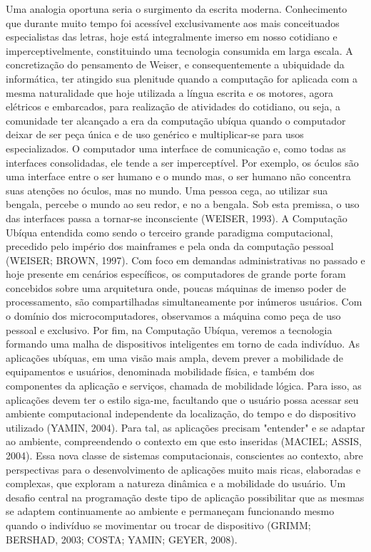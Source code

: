 \documentclass[12pt,a4paper,compsoc]{IEEEtran}
\begin{document}
Uma analogia oportuna seria o surgimento da escrita moderna. Conhecimento que durante muito tempo foi acessível exclusivamente aos mais conceituados especialistas das letras, hoje está integralmente imerso em nosso cotidiano e imperceptivelmente, constituindo uma tecnologia consumida em larga escala.
A concretização do pensamento de Weiser, e consequentemente a ubiquidade da informática, ter atingido sua plenitude quando a computação for aplicada com a mesma naturalidade que hoje  utilizada a língua escrita e os motores, agora elétricos e embarcados, para realização de atividades do cotidiano, ou seja, a comunidade ter alcançado a era da computação ubíqua quando o computador deixar de ser peça única e de uso genérico e multiplicar-se para usos especializados.
O computador uma interface de comunicação e, como todas as interfaces consolidadas, ele tende a ser imperceptível. Por exemplo, os óculos são uma interface entre o ser humano e o mundo mas, o ser humano não concentra suas atenções no óculos, mas no mundo. Uma pessoa cega, ao utilizar sua bengala, percebe o mundo ao seu redor, e no a bengala. Sob esta premissa, o uso das interfaces passa a tornar-se inconsciente (WEISER, 1993).
A Computação Ubíqua entendida como sendo o terceiro grande paradigma computacional, precedido pelo império dos mainframes e pela onda da computação pessoal (WEISER; BROWN, 1997). Com foco em demandas administrativas no passado e hoje presente em cenários específicos, os computadores de grande porte foram concebidos sobre uma arquitetura onde, poucas máquinas de imenso poder de processamento, são compartilhadas simultaneamente por inúmeros usuários. Com o domínio dos microcomputadores, observamos a máquina como peça de uso pessoal e exclusivo. Por fim, na Computação Ubíqua, veremos a tecnologia formando uma malha de dispositivos inteligentes em torno de cada indivíduo.
As aplicações ubíquas, em uma visão mais ampla, devem prever a mobilidade de equipamentos e usuários, denominada mobilidade física, e também dos componentes da aplicação e serviços, chamada de mobilidade lógica. Para isso, as aplicações devem ter o estilo siga-me, facultando que o usuário possa acessar seu ambiente computacional independente da localização, do tempo e do dispositivo utilizado (YAMIN, 2004).
Para tal, as aplicações precisam "entender" e se adaptar ao ambiente, compreendendo o contexto em que esto inseridas (MACIEL; ASSIS, 2004). Essa nova classe de sistemas computacionais, conscientes ao contexto, abre perspectivas para o desenvolvimento de aplicações muito mais ricas, elaboradas e complexas, que exploram a natureza dinâmica e a mobilidade do usuário. Um desafio central na programação deste tipo de aplicação  possibilitar que as mesmas se adaptem continuamente ao ambiente e permaneçam funcionando mesmo quando o indivíduo se movimentar ou trocar de dispositivo (GRIMM; BERSHAD, 2003; COSTA; YAMIN; GEYER, 2008).
\end{document}
